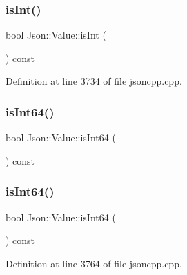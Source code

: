 \hypertarget{class_json_1_1_value_aff51d8b52979ca06cf9d909accd5f695}{}\label{class_json_1_1_value_aff51d8b52979ca06cf9d909accd5f695} 
\subsubsection{\texorpdfstring{is\+Int()}{isInt()}\hspace{0.1cm}{\footnotesize\ttfamily [2/2]}}
{\footnotesize\ttfamily bool Json\+::\+Value\+::is\+Int (\begin{DoxyParamCaption}{ }\end{DoxyParamCaption}) const}



Definition at line 3734 of file jsoncpp.\+cpp.

\hypertarget{class_json_1_1_value_a4a81fb3c3acdbb68b2e2f30836a4f53e}{}\label{class_json_1_1_value_a4a81fb3c3acdbb68b2e2f30836a4f53e} 
\subsubsection{\texorpdfstring{is\+Int64()}{isInt64()}\hspace{0.1cm}{\footnotesize\ttfamily [1/2]}}
{\footnotesize\ttfamily bool Json\+::\+Value\+::is\+Int64 (\begin{DoxyParamCaption}{ }\end{DoxyParamCaption}) const}

\hypertarget{class_json_1_1_value_a4a81fb3c3acdbb68b2e2f30836a4f53e}{}\label{class_json_1_1_value_a4a81fb3c3acdbb68b2e2f30836a4f53e} 
\subsubsection{\texorpdfstring{is\+Int64()}{isInt64()}\hspace{0.1cm}{\footnotesize\ttfamily [2/2]}}
{\footnotesize\ttfamily bool Json\+::\+Value\+::is\+Int64 (\begin{DoxyParamCaption}{ }\end{DoxyParamCaption}) const}



Definition at line 3764 of file jsoncpp.\+cpp.

